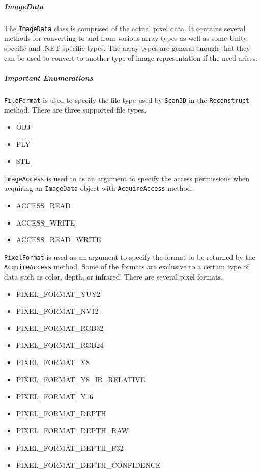 \documentclass[12pt]{article}
\providecommand{\tightlist}{%
  \setlength{\itemsep}{0pt}\setlength{\parskip}{0pt}}
\begin{document}
\subparagraph{ImageData}\label{imagedata}

The \texttt{ImageData} class is comprised of the actual pixel data. It
contains several methods for converting to and from various array types
as well as some Unity specific and .NET specific types. The array types
are general enough that they can be used to convert to another type of
image representation if the need arises.

\subparagraph{Important Enumerations}\label{important-enumerations}

\texttt{FileFormat} is used to specify the file type used by
\texttt{Scan3D} in the \texttt{Reconstruct} method. There are three
supported file types.

\begin{itemize}
\tightlist
\item
  OBJ
\item
  PLY
\item
  STL
\end{itemize}

\texttt{ImageAccess} is used to as an argument to specify the access
permissions when acquiring an \texttt{ImageData} object with
\texttt{AcquireAccess} method.

\begin{itemize}
\tightlist
\item
  ACCESS\_READ
\item
  ACCESS\_WRITE
\item
  ACCESS\_READ\_WRITE
\end{itemize}

\texttt{PixelFormat} is used as an argument to specify the format to be
returned by the \texttt{AcquireAccess} method. Some of the formats are
exclusive to a certain type of data such as color, depth, or infrared.
There are several pixel formats.

\begin{itemize}
\tightlist
\item
  PIXEL\_FORMAT\_YUY2
\item
  PIXEL\_FORMAT\_NV12
\item
  PIXEL\_FORMAT\_RGB32
\item
  PIXEL\_FORMAT\_RGB24
\item
  PIXEL\_FORMAT\_Y8
\item
  PIXEL\_FORMAT\_Y8\_IR\_RELATIVE
\item
  PIXEL\_FORMAT\_Y16
\item
  PIXEL\_FORMAT\_DEPTH
\item
  PIXEL\_FORMAT\_DEPTH\_RAW
\item
  PIXEL\_FORMAT\_DEPTH\_F32
\item
  PIXEL\_FORMAT\_DEPTH\_CONFIDENCE
\end{itemize}
\end{document}
